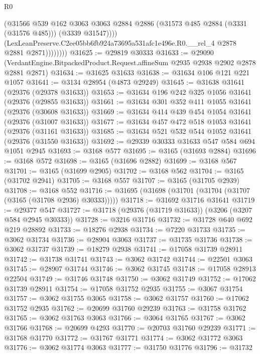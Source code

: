 \begin{lexlean}{R0}
\begin{coremodule}
                      (@31566
                        @539
                        @162
                        @3063
                        @3063
                        @2884
                        @2886
                        (@31573 @485 @2884 (@3331 (@31576 @485)))
                        (@3339 @31547))))
                  (LexLeanPreserve.C2ee05bb6fb924a73695a531afc1e496e.R0.__rel_4
                    @2878
                    @2881
                    @2871))))))))
@31625 := @29819 @30333
@31633 := @29090
    (VerdantEngine.BitpackedProduct.Request.affineSum @2935 @2938 @2902 @2878 @2881 @2871)
@31634 := @31625 @31633
@31638 := @31634 @106 @121 @221 @1057
@31641 := @3134 @28954 (@4873 @29249)
@31645 := @31638 @31641 (@29376 (@29378 @31633))
@31653 := @31634 @196 @242 @325 @1056 @31641 (@29376 (@29855 @31633))
@31661 := @31634 @301 @352 @411 @1055 @31641 (@29376 (@30608 @31633))
@31669 := @31634 @414 @439 @454 @1054 @31641 (@29376 (@31007 @31633))
@31677 := @31634 @457 @472 @518 @1053 @31641 (@29376 (@31161 @31633))
@31685 := @31634 @521 @532 @544 @1052 @31641 (@29376 (@31550 @31633))
@31692 := @29339 @30333 @31633 @547 @584 @694 @1051 @2945
@31693 := @3168 @577
@31695 := @3165 (@31693 @2884)
@31696 := @3168 @572
@31698 := @3165 (@31696 @2882)
@31699 := @3168 @567
@31701 := @3165 (@31699 @2905)
@31702 := @3168 @562
@31704 := @3165 (@31702 @2941)
@31705 := @3168 @557
@31707 := @3165 (@31705 @2939)
@31708 := @3168 @552
@31716 := @31695 (@31698 (@31701 (@31704 (@31707 (@3165 (@31708 @2936) @30333)))))
@31718 := @31692 @31716 @31641
@31719 := @29377 @547
@31727 := @31718 (@29376 (@31719 @31633)) (@3206 (@3207 @584 @2945 @30333))
@31728 := @3216 @31716
@31732 := @31728 @640 @692 @219 @28892
@31733 := @18276 @2938
@31734 := @7220 @31733
@31735 := @3062 @31734
@31736 := @28904 @3063
@31737 := @31735 @31736
@31738 := @3062 @31737
@31739 := @18279 @2938
@31741 := @17058 @31739 @28911
@31742 := @31738 @31741
@31743 := @3062 @31742
@31744 := @22501 @3063
@31745 := @28907 @31744
@31746 := @3062 @31745
@31748 := @17058 @28913 @22504
@31749 := @31746 @31748
@31750 := @3062 @31749
@31752 := @17062 @31739 @28911
@31754 := @17058 @31752 @2935
@31755 := @3067 @31754
@31757 := @3062 @31755 @3065
@31758 := @3062 @31757
@31760 := @17062 @31752 @2935
@31762 := @20699 @31760 @29239
@31763 := @31758 @31762
@31765 := @3062 @31763 @3063
@31766 := @3064 @31765
@31767 := @3062 @31766
@31768 := @20699 @4293
@31770 := @20703 @31760 @29239
@31771 := @31768 @31770
@31772 := @31767 @31771
@31774 := @3062 @31772 @3063
@31776 := @3062 @31774 @3063
@31777 := @31750 @31776
@31796 := @31732

\end{coremodule}
\end{lexlean}
